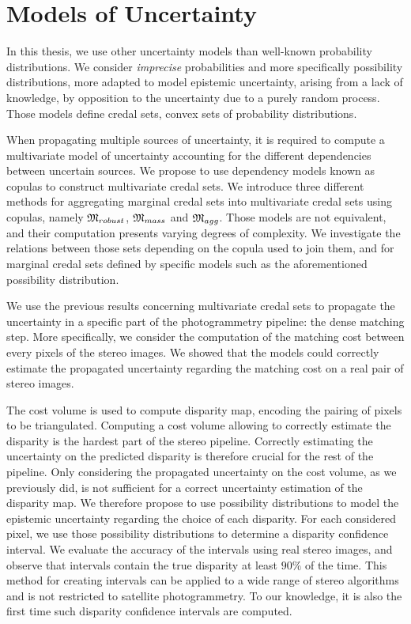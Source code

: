 \section*{Models of Uncertainty}
In this thesis, we use other uncertainty models than well-known probability distributions. We consider \textit{imprecise} probabilities and more specifically possibility distributions, more adapted to model epistemic uncertainty, \ie arising from a lack of knowledge, by opposition to the uncertainty due to a purely random process. Those models define credal sets, \ie convex sets of probability distributions. 

When propagating multiple sources of uncertainty, it is required to compute a multivariate model of uncertainty accounting for the different dependencies between uncertain sources. We propose to use dependency models known as copulas to construct multivariate credal sets. We introduce three different methods for aggregating marginal credal sets into multivariate credal sets using copulas, namely $\mathfrak{M}_{robust}$, $\mathfrak{M}_{mass}$ and $\mathfrak{M}_{agg}$. Those models are not equivalent, and their computation presents varying degrees of complexity. We investigate the relations between those sets depending on the copula used to join them, and for marginal credal sets defined by specific models such as the aforementioned possibility distribution.

We use the previous results concerning multivariate credal sets to propagate the uncertainty in a specific part of the photogrammetry pipeline: the dense matching step. More specifically, we consider the computation of the matching cost between every pixels of the stereo images. We showed that the models could correctly estimate the propagated uncertainty regarding the matching cost on a real pair of stereo images.

The cost volume is used to compute disparity map, encoding the pairing of pixels to be triangulated. Computing a cost volume allowing to correctly estimate the disparity is the hardest part of the stereo pipeline. Correctly estimating the uncertainty on the predicted disparity is therefore crucial for the rest of the pipeline. Only considering the propagated uncertainty on the cost volume, as we previously did, is not sufficient for a correct uncertainty estimation of the disparity map. We therefore propose to use possibility distributions to model the epistemic uncertainty regarding the choice of each disparity. For each considered pixel, we use those possibility distributions to determine a disparity confidence interval. We evaluate the accuracy of the intervals using real stereo images, and observe that intervals contain the true disparity at least $90\%$ of the time. This method for creating intervals can be applied to a wide range of stereo algorithms and is not restricted to satellite photogrammetry. To our knowledge, it is also the first time such disparity confidence intervals are computed. 

